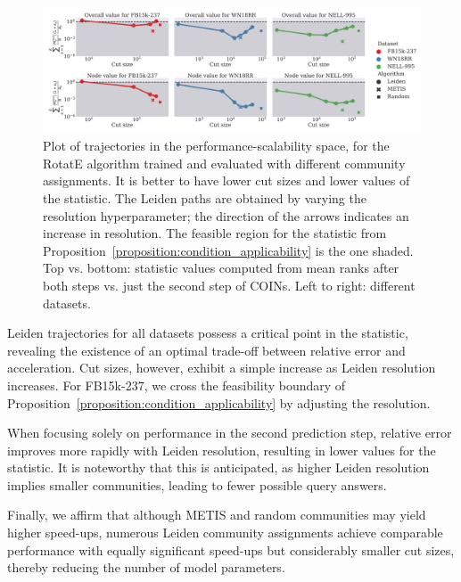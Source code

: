 \begin{figure}[ht!]
\begin{center}
\includegraphics[width=\linewidth]{figures/coins/feasibility_extra}
\end{center}
\caption[Plot of trajectories in the performance-scalability space, for the RotatE algorithm trained and evaluated with different community assignments.]{Plot of trajectories in the performance-scalability space, for the RotatE algorithm trained and evaluated with different community assignments. It is better to have lower cut sizes and lower values of the statistic. The Leiden paths are obtained by varying the resolution hyperparameter; the direction of the arrows indicates an increase in resolution. The feasible region for the statistic from Proposition~\ref{proposition:condition_applicability} is the one shaded. Top vs. bottom: statistic values computed from mean ranks after both steps vs. just the second step of COINs. Left to right: different datasets.}
\label{fig:feasibility_trajectories}
\end{figure}

Leiden trajectories for all datasets possess a critical point in the statistic, revealing the existence of an optimal trade-off between relative error and acceleration. Cut sizes, however, exhibit a simple increase as Leiden resolution increases. For FB15k-237, we cross the feasibility boundary of Proposition~\ref{proposition:condition_applicability} by adjusting the resolution. 

When focusing solely on performance in the second prediction step, relative error improves more rapidly with Leiden resolution, resulting in lower values for the statistic. It is noteworthy that this is anticipated, as higher Leiden resolution implies smaller communities, leading to fewer possible query answers. 

Finally, we affirm that although METIS and random communities may yield higher speed-ups, numerous Leiden community assignments achieve comparable performance with equally significant speed-ups but considerably smaller cut sizes, thereby reducing the number of model parameters.

